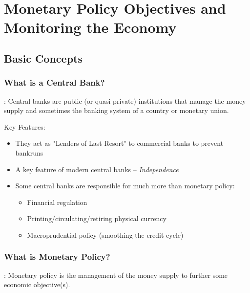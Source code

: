 \chapter{Monetary Policy Objectives and Monitoring the Economy}


\section{Basic Concepts}

    \subsection{What is a Central Bank?}
    
        : Central banks are public (or quasi-private) institutions that manage the money supply and sometimes the banking system of a country or monetary union.

        Key Features:
        \begin{itemize}
            \item They act as "Lenders of Last Resort" to commercial banks to prevent bankruns
            \item A key feature of modern central banks -- \emph{Independence}
            \item Some central banks are responsible for much more than monetary policy:
            \begin{itemize}
                \item Financial regulation
                \item Printing/circulating/retiring physical currency
                \item Macroprudential policy (smoothing the credit cycle)
            \end{itemize}
        \end{itemize}
        
    \subsection{What is Monetary Policy?}

        : Monetary policy is the management of the money supply to further some economic objective(s).

